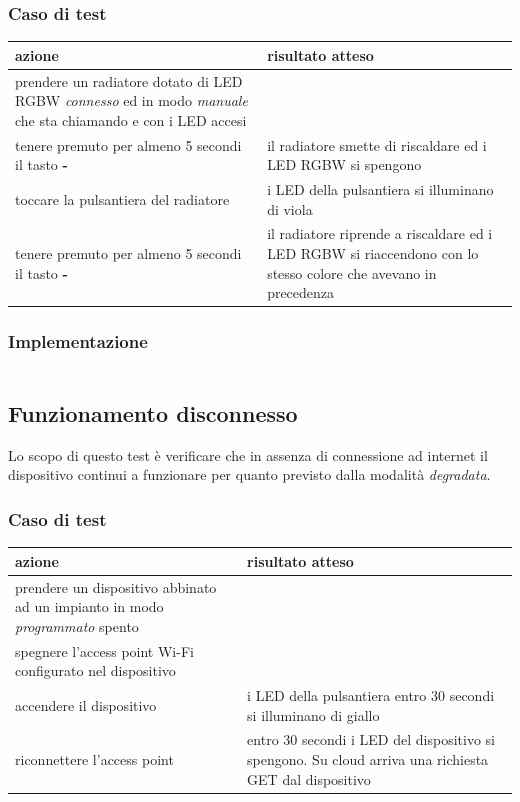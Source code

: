 \documentclass[12pt,a4paper,twoside,titlepage]{book}
\begin{document}
\subsubsection{Caso di test}
\begin{center}
\begin{tabular}{| p{} | p{} |}
    \hline \textbf{azione} & \textbf{risultato atteso} \\
    \hline prendere un radiatore dotato di LED RGBW \textit{connesso} ed in modo \textit{manuale} che sta chiamando e con i LED accesi & \\
    \hline tenere premuto per almeno 5 secondi il tasto \textbf{-} & il radiatore smette di riscaldare ed i LED RGBW si spengono \\
    \hline toccare la pulsantiera del radiatore & i LED della pulsantiera si illuminano di viola \\
    \hline tenere premuto per almeno 5 secondi il tasto \textbf{-} & il radiatore riprende a riscaldare ed i LED RGBW si riaccendono con lo stesso colore che avevano in precedenza \\
    \hline
\end{tabular}
\end{center}

\subsubsection{Implementazione}
\inputminted{python3}{src/test_standby.py}

\subsection{Funzionamento disconnesso}

Lo scopo di questo test è verificare che in assenza di connessione ad internet il
dispositivo continui a funzionare per quanto previsto dalla modalità \textit{degradata}.

\subsubsection{Caso di test}
\begin{center}
\begin{tabular}{| p{} | p{} |}
    \hline \textbf{azione} & \textbf{risultato atteso} \\
    \hline prendere un dispositivo abbinato ad un impianto in modo \textit{programmato} spento & \\
    \hline spegnere l'access point Wi-Fi configurato nel dispositivo & \\
    \hline accendere il dispositivo & i LED della pulsantiera entro 30 secondi si illuminano di giallo \\
    \hline riconnettere l'access point & entro 30 secondi i LED del dispositivo si spengono. Su cloud arriva una richiesta GET dal dispositivo \\
    \hline
\end{tabular}
\end{center}
\end{document}
